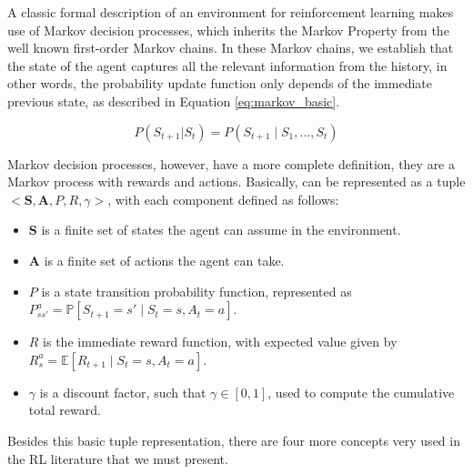 A classic formal description of an environment for reinforcement learning makes use of Markov decision processes, which inherits the Markov Property from the well known first-order Markov chains. In these Markov chains, we establish that the state of the agent captures all the relevant information from the history, in other words, the probability update function only depends of the immediate previous state, as described in Equation \eqref{eq:markov_basic}.

\begin{equation}
P(S_{t+1} | S_t) = P(S_{t+1} \mid S_1, ..., S_t)
\label{eq:markov_basic}
\end{equation}

Markov decision processes, however, have a more complete definition, they are a Markov process with rewards and actions. Basically, can be represented as a tuple $<\textbf{S}, \textbf{A}, P, R, \gamma>$, with each component defined as follows:
\begin{itemize}
\item
	$\textbf{S}$ is a finite set of states the agent can assume in the environment.
\item
	$\textbf{A}$ is a finite set of actions the agent can take.
\item
	$P$ is a state transition probability function, represented as $P_{ss'}^a = \mathbb{P}[S_{t+1}=s' \mid S_t = s, A_t = a]$.
\item
	$R$ is the immediate reward function, with expected value given by $R_s^a = \mathbb{E}[R_{t+1} \mid S_t = s, A_t = a]$.
\item
	$\gamma$ is a discount factor, such that $\gamma \in [0,1]$, used to compute the cumulative total reward.
	
\end{itemize}

Besides this basic tuple representation, there are four more concepts very used in the RL literature that we must present.

